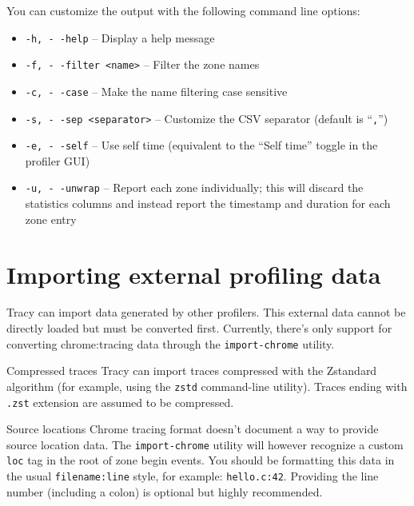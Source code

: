 \documentclass[hidelinks,titlepage,a4paper]{article}
\begin{document}
You can customize the output with the following command line options:

\begin{itemize}
  \item \texttt{-h, -\hspace{-1.25ex} -help} -- Display a help message
  \item \texttt{-f, -\hspace{-1.25ex} -filter <name>} -- Filter the zone names
  \item \texttt{-c, -\hspace{-1.25ex} -case} -- Make the name filtering case sensitive
  \item \texttt{-s, -\hspace{-1.25ex} -sep <separator>} -- Customize the CSV separator (default is ``\texttt{,}'')
  \item \texttt{-e, -\hspace{-1.25ex} -self} -- Use self time (equivalent to the ``Self time'' toggle in the profiler GUI)
  \item \texttt{-u, -\hspace{-1.25ex} -unwrap} -- Report each zone individually; this will discard the statistics columns and instead report the timestamp and duration for each zone entry
\end{itemize}

\section{Importing external profiling data}
\label{importingdata}

Tracy can import data generated by other profilers. This external data cannot be directly loaded but must be converted first. Currently, there's only support for converting chrome:tracing data through the \texttt{import-chrome} utility.

\begin{bclogo}[
noborder=true,
couleur=black!5,
logo=\bclampe
]{Compressed traces}
Tracy can import traces compressed with the Zstandard algorithm (for example, using the \texttt{zstd} command-line utility). Traces ending with \texttt{.zst} extension are assumed to be compressed.
\end{bclogo}

\begin{bclogo}[
noborder=true,
couleur=black!5,
logo=\bclampe
]{Source locations}
Chrome tracing format doesn't document a way to provide source location data. The \texttt{import-chrome} utility will however recognize a custom \texttt{loc} tag in the root of zone begin events. You should be formatting this data in the usual \texttt{filename:line} style, for example: \texttt{hello.c:42}. Providing the line number (including a colon) is optional but highly recommended.
\end{bclogo}
\end{document}
